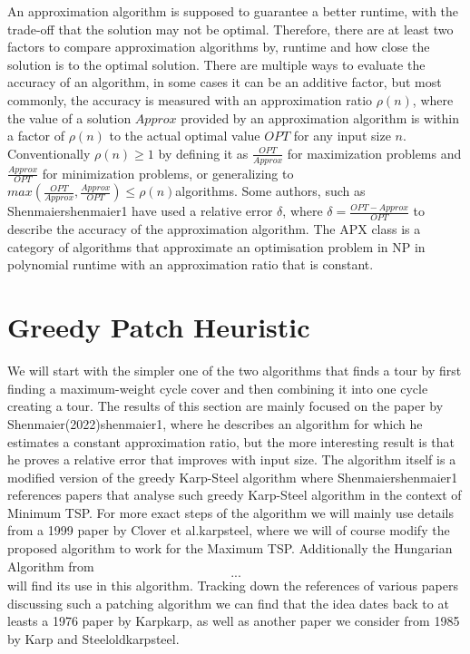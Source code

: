 \documentclass{article}
\begin{document}

An approximation algorithm is supposed to guarantee a better runtime, with the
trade-off that the solution may not be optimal. Therefore, there are at least
two factors to compare approximation algorithms by, runtime and how close the
solution is to the optimal solution. There are multiple ways to evaluate the
accuracy of an algorithm, in some cases it can be an additive factor, but most
commonly, the accuracy is measured with an approximation ratio $\rho(n)$, where
the value of a solution $Approx$ provided by an approximation algorithm is
within a factor of $\rho(n)$ to the actual optimal value $OPT$ for any input
size $n$. Conventionally $\rho(n)\geq 1$ by defining it as $\frac{OPT}{Approx}$
for maximization problems and $\frac{Approx}{OPT}$ for minimization problems, or
generalizing to $max(\frac{OPT}{Approx}, \frac{Approx}{OPT})\leq
\rho(n)${algorithms}. Some authors, such as
Shenmaier{shenmaier1} have used a relative error $\delta$, where $\delta =
\frac{ OPT-Approx}{OPT}$ to describe the accuracy of the approximation
algorithm. The APX class is a category of algorithms that approximate an
optimisation problem in NP in polynomial runtime with an approximation ratio
that is constant. 

\section{Greedy Patch Heuristic}
\label{sec:gph}

We will start with the simpler one of the two algorithms that finds a tour by
first finding a maximum-weight cycle cover and then combining it into one cycle
creating a tour. The results of this section are mainly focused on the paper by
Shenmaier(2022){shenmaier1}, where he describes an algorithm for which he
estimates a constant approximation ratio, but the more interesting result is
that he proves a relative error that improves with input size. The algorithm
itself is a modified version of the greedy Karp-Steel algorithm where
Shenmaier{shenmaier1} references papers that analyse such greedy
Karp-Steel algorithm in the context of Minimum TSP. For more exact steps of the
algorithm we will mainly use details from a 1999 paper by Clover et
al.{karpsteel}, where we will of course modify the proposed algorithm to
work for the Maximum TSP. Additionally the Hungarian Algorithm from \[...\] will find
its use in this algorithm. Tracking down the references of various papers
discussing such a patching algorithm we can find that the idea dates back to at
leasts a 1976 paper by Karp{karp}, as well as another paper we consider
from 1985 by Karp and Steel{oldkarpsteel}.
\end{document}
